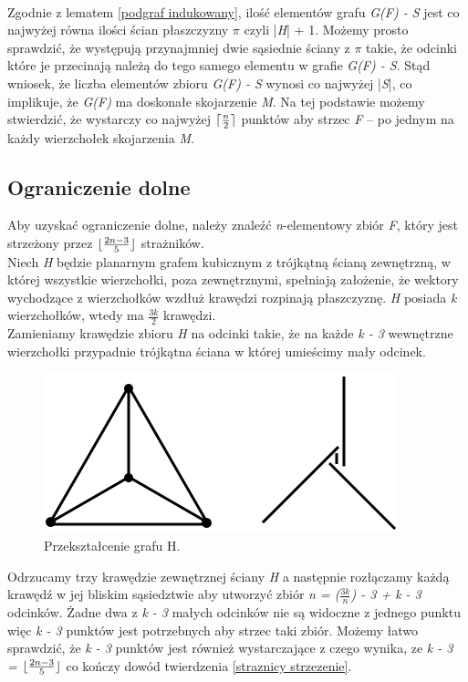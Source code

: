 \documentclass[brudnopis]{xmgr}
\DeclarePairedDelimiter\ceil{\lceil}{\rceil}
\DeclarePairedDelimiter\floor{\lfloor}{\rfloor}
\begin{document}
\\\indent Zgodnie z lematem \ref{podgraf indukowany}, ilość elementów grafu \textit{G(F) - S} jest co najwyżej równa ilości ścian płaszczyzny $\pi$ czyli |\textit{H}| + 1. Możemy prosto sprawdzić, że występują przynajmniej dwie sąsiednie ściany z $\pi$ takie, że odcinki które je przecinają należą do tego samego elementu w grafie \textit{G(F) - S}. Stąd wniosek, że liczba elementów zbioru \textit{G(F) - S} wynosi co najwyżej |\textit{S}|, co implikuje, że \textit{G(F)} ma doskonałe skojarzenie \textit{M}. Na tej podstawie możemy stwierdzić, że wystarczy co najwyżej $\ceil{\frac{n}{2}}$ punktów aby strzec \textit{F} -- po jednym na każdy wierzchołek skojarzenia \textit{M}.
\subsection{Ograniczenie dolne}
\indent Aby uzyskać ograniczenie dolne, należy znaleźć \textit{n}-elementowy zbiór \textit{F}, który jest strzeżony przez $\floor{\frac{2n-3}{5}}$ strażników.
\\\indent Niech \textit{H} będzie planarnym grafem kubicznym z trójkątną ścianą zewnętrzną, w której wszystkie wierzchołki, poza zewnętrznymi, spełniają założenie, że wektory wychodzące z wierzchołków wzdłuż krawędzi rozpinają płaszczyznę. \textit{H} posiada \textit{k} wierzchołków, wtedy ma $\frac{3k}{2}$ krawędzi.
\\\indent Zamieniamy krawędzie zbioru \textit{H} na odcinki takie, że na każde \textit{k - 3} wewnętrzne wierzchołki przypadnie trójkątna ściana w której umieścimy mały odcinek.
\begin{figure}[ht!]
 \centering
  \includegraphics{rysunki/dolna_granica.png}
  \caption{Przekształcenie grafu H.}
  \label{fig:przeksztalcenie h}
\end{figure} 
Odrzucamy trzy krawędzie zewnętrznej ściany \textit{H} a następnie rozłączamy każdą krawędź w jej bliskim sąsiedztwie aby utworzyć zbiór \textit{n = ($\frac{3k}{n}$) - 3 + k  - 3} odcinków. Żadne dwa z \textit{k - 3} małych odcinków nie są widoczne z jednego punktu więc \textit{k - 3} punktów jest potrzebnych aby strzec taki zbiór. Możemy łatwo sprawdzić, że \textit{k - 3} punktów jest również wystarczające z czego wynika, ze \textit{k - 3 = $\floor{\frac{2n - 3}{5}}$} co kończy dowód twierdzenia \ref{straznicy strzezenie}.
\end{document}

